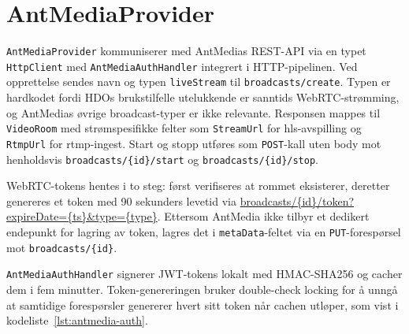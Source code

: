 \section{AntMediaProvider}
\label{sec:antmedia-provider}


\texttt{AntMediaProvider} kommuniserer med AntMedias REST-API via en typet \texttt{HttpClient} med \texttt{AntMediaAuthHandler} integrert i HTTP-pipelinen. Ved opprettelse sendes navn og typen \texttt{liveStream} til \texttt{broadcasts/create}. Typen er hardkodet fordi HDOs brukstilfelle utelukkende er sanntids WebRTC-strømming, og AntMedias øvrige broadcast-typer er ikke relevante. Responsen mappes til \texttt{VideoRoom} med strømspesifikke felter som \texttt{StreamUrl} for \gls{hls}-avspilling og \texttt{RtmpUrl} for \gls{rtmp}-ingest. Start og stopp utføres som \texttt{POST}-kall uten body mot henholdsvis \texttt{broadcasts/\{id\}/start} og \texttt{broadcasts/\{id\}/stop}.

WebRTC-tokens hentes i to steg: først verifiseres at rommet eksisterer, deretter genereres et token med 90 sekunders levetid via \url{broadcasts/{id}/token?expireDate={ts}\&type={type}}. Ettersom AntMedia ikke tilbyr et dedikert endepunkt for lagring av token, lagres det i \texttt{metaData}-feltet via en \texttt{PUT}-forespørsel mot \texttt{broadcasts/\{id\}}.

\texttt{AntMediaAuthHandler} signerer JWT-tokens lokalt med HMAC-SHA256 og cacher dem i fem minutter. Token-genereringen bruker double-check locking for å unngå at samtidige forespørsler genererer hvert sitt token når cachen utløper, som vist i kodeliste~\ref{lst:antmedia-auth}.

